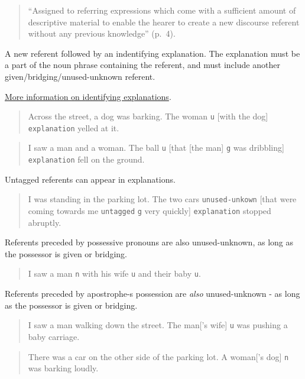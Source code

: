 \documentclass[
]{book}
\begin{document}
\begin{quote}
``Assigned to referring expressions which come with a sufficient amount of descriptive material to enable the hearer to create a new discourse referent without any previous knowledge'' (p.~4).
\end{quote}

A new referent followed by an indentifying explanation.
The explanation must be a part of the noun phrase containing the referent, and must include another given/bridging/unused-unknown referent.

\protect\hyperlink{referent-explanations}{More information on identifying explanations}.

\begin{quote}
Across the street, a dog was barking.
The woman \texttt{u} {[}with the dog{]} \texttt{explanation} yelled at it.
\end{quote}

\begin{quote}
I saw a man and a woman.
The ball \texttt{u} {[}that {[}the man{]} \texttt{g} was dribbling{]} \texttt{explanation} fell on the ground.
\end{quote}

Untagged referents can appear in explanations.

\begin{quote}
I was standing in the parking lot.
The two cars \texttt{unused-unkown} {[}that were coming towards me \texttt{untagged} \texttt{g} very quickly{]} \texttt{explanation} stopped abruptly.
\end{quote}

Referents preceded by possessive pronouns are also unused-unknown,
as long as the possessor is given or bridging.

\begin{quote}
I saw a man \texttt{n} with his wife \texttt{u} and their baby \texttt{u}.
\end{quote}

Referents preceded by apostrophe-s possession are \emph{also} unused-unknown -
as long as the possessor is given or bridging.

\begin{quote}
I saw a man walking down the street.
The man{[}'s wife{]} \texttt{u} was pushing a baby carriage.
\end{quote}

\begin{quote}
There was a car on the other side of the parking lot.
A woman{[}'s dog{]} \texttt{n} was barking loudly.
\end{quote}
\end{document}
